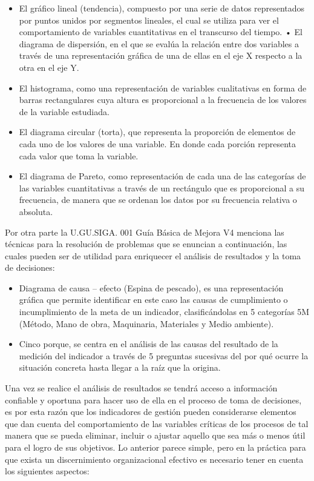 \documentclass[
]{book}
\begin{document}
\begin{itemize}
\item
  El gráfico lineal (tendencia), compuesto por una serie de datos representados por puntos unidos por segmentos lineales, el cual se utiliza para ver el comportamiento de variables cuantitativas en el transcurso del tiempo.
  • El diagrama de dispersión, en el que se evalúa la relación entre dos variables a través de una representación gráfica de una de ellas en el eje X respecto a la otra en el eje Y.
\item
  El histograma, como una representación de variables cualitativas en forma de barras rectangulares cuya altura es proporcional a la frecuencia de los valores de la variable estudiada.
\item
  El diagrama circular (torta), que representa la proporción de elementos de cada uno de los valores de una variable. En donde cada porción representa cada valor que toma la variable.
\item
  El diagrama de Pareto, como representación de cada una de las categorías de las variables cuantitativas a través de un rectángulo que es proporcional a su frecuencia, de manera que se ordenan los datos por su frecuencia relativa o absoluta.
\end{itemize}

Por otra parte la U.GU.SIGA. 001 Guía Básica de Mejora V4 menciona las técnicas para la resolución de problemas que se enuncian a continuación, las cuales pueden ser de utilidad para enriquecer el análisis de resultados y la toma de decisiones:

\begin{itemize}
\item
  Diagrama de causa -- efecto (Espina de pescado), es una representación gráfica que permite identificar en este caso las causas de cumplimiento o incumplimiento de la meta de un indicador, clasificándolas en 5 categorías 5M (Método, Mano de obra, Maquinaria, Materiales y Medio ambiente).
\item
  Cinco porque, se centra en el análisis de las causas del resultado de la medición del indicador a través de 5 preguntas sucesivas del por qué ocurre la situación concreta hasta llegar a la raíz que la origina.
\end{itemize}

Una vez se realice el análisis de resultados se tendrá acceso a información confiable y oportuna para hacer uso de ella en el proceso de toma de decisiones, es por esta razón que los indicadores de gestión pueden considerarse elementos que dan cuenta del comportamiento de las variables críticas de los procesos de tal manera que se pueda eliminar, incluir o ajustar aquello que sea más o menos útil para el logro de sus objetivos. Lo anterior parece simple, pero en la práctica para que exista un discernimiento organizacional efectivo es necesario tener en cuenta los siguientes aspectos:
\end{document}
